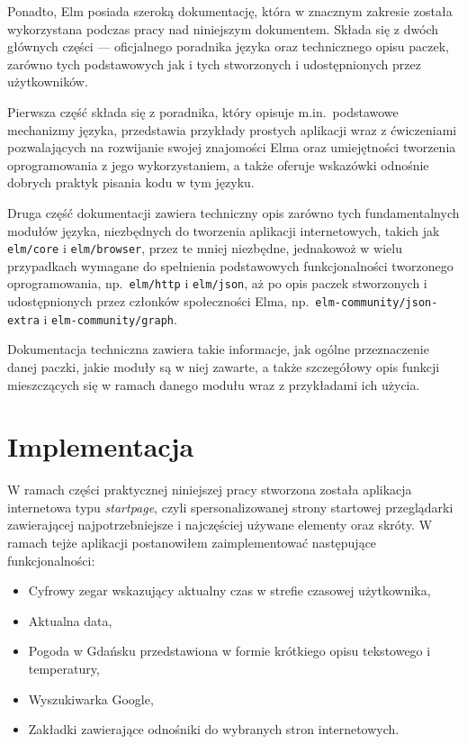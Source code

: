 \documentclass[twoside,a4paper]{report}
\begin{document}
Ponadto, Elm posiada szeroką dokumentację, która w znacznym zakresie została wykorzystana podczas pracy nad niniejszym dokumentem.
Składa się z dwóch głównych części --- oficjalnego poradnika języka oraz technicznego opisu paczek, zarówno tych podstawowych jak i tych stworzonych i udostępnionych przez użytkowników.

Pierwsza część składa się z poradnika, który opisuje m.in.~podstawowe mechanizmy języka, przedstawia przykłady prostych aplikacji wraz z ćwiczeniami pozwalających na rozwijanie swojej znajomości Elma oraz umiejętności tworzenia oprogramowania z jego wykorzystaniem, a także oferuje wskazówki odnośnie dobrych praktyk pisania kodu w tym języku.

Druga część dokumentacji zawiera techniczny opis zarówno tych fundamentalnych modułów języka, niezbędnych do tworzenia aplikacji internetowych, takich jak \texttt{elm/core} i \texttt{elm/browser}, przez te mniej niezbędne, jednakowoż w wielu przypadkach wymagane do spełnienia podstawowych funkcjonalności tworzonego oprogramowania, np.~\texttt{elm/http} i \texttt{elm/json}, aż po opis paczek stworzonych i udostępnionych przez członków społeczności Elma, np.~\texttt{elm-community/json-extra} i \texttt{elm-community/graph}.

Dokumentacja techniczna zawiera takie informacje, jak ogólne przeznaczenie danej paczki, jakie moduły są w niej zawarte, a także szczegółowy opis funkcji mieszczących się w ramach danego modułu wraz z przykładami ich użycia.


\chapter{Implementacja}
W ramach części praktycznej niniejszej pracy stworzona została aplikacja internetowa typu \textit{startpage}, czyli spersonalizowanej strony startowej przeglądarki zawierającej najpotrzebniejsze i najczęściej używane elementy oraz skróty.
W ramach tejże aplikacji postanowiłem zaimplementować następujące funkcjonalności:

\begin{itemize}[noitemsep,topsep=0pt]
    \item Cyfrowy zegar wskazujący aktualny czas w strefie czasowej użytkownika,
    \item Aktualna data,
    \item Pogoda w Gdańsku przedstawiona w formie krótkiego opisu tekstowego i temperatury,
    \item Wyszukiwarka Google,
    \item Zakładki zawierające odnośniki do wybranych stron internetowych.
\end{itemize}
\end{document}
